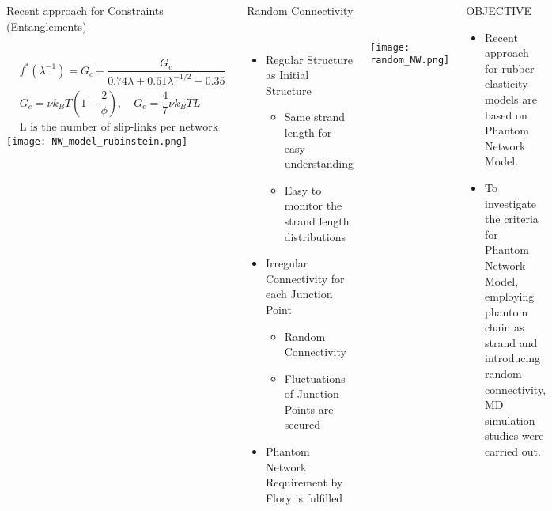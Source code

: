 \begin{columns}[totalwidth=.85\linewidth]
\begin{itembox}[l]{Recent approach for Constraints (Entanglements)}
		\begin{columns}[totalwidth=1\textwidth]
			\begin{align*}
				&f^*(\lambda^{-1}) = G_c + \dfrac{G_e}{0.74 \lambda + 0.61 \lambda^{-1/2} - 0.35} \\
				&G_c = \nu k_B T \left(1-\dfrac{2}{\phi} \right), \quad G_e = \dfrac{4}{7} \nu k_B T L \\
				& \text{L is the number of slip-links per network chain}
			\end{align*}
			\texttt{[image: NW\_model\_rubinstein.png]}
		\end{columns}
	\end{itembox}

	\begin{itembox}[l]{Random Connectivity\cite{flory2}}
		\begin{columns}[totalwidth=\textwidth]
				\begin{itemize}
					\item Regular Structure as Initial Structure
					\begin{itemize}
						\normalsize
						\item Same strand length for easy understanding
						\item Easy to monitor the strand length distributions
					\end{itemize}
					\item Irregular Connectivity for each Junction Point
						\begin{itemize}
							\normalsize
							\item Random Connectivity
							\item Fluctuations of Junction Points are secured
						\end{itemize}
					\item Phantom Network Requirement by Flory is fulfilled
				\end{itemize}
				\centering
				\texttt{[image: random\_NW.png]}
		\end{columns}
	\end{itembox}

	\begin{itembox}[l]{OBJECTIVE}
		\begin{itemize}
			\item Recent approach for rubber elasticity models are based on Phantom Network Model.
			\item To investigate the criteria for Phantom Network Model, employing phantom chain 
			as strand and introducing random connectivity, MD simulation studies were carried out.
        \end{itemize}
	\end{itembox}
\end{columns}